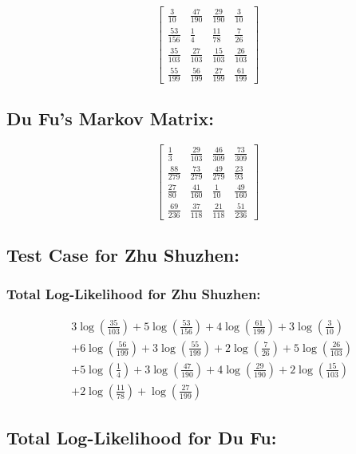 \documentclass[12pt]{article}
\begin{document}
\[
\begin{bmatrix}
\frac{3}{10} & \frac{47}{190} & \frac{29}{190} & \frac{3}{10} \\
\frac{53}{156} & \frac{1}{4} & \frac{11}{78} & \frac{7}{26} \\
\frac{35}{103} & \frac{27}{103} & \frac{15}{103} & \frac{26}{103} \\
\frac{55}{199} & \frac{56}{199} & \frac{27}{199} & \frac{61}{199}
\end{bmatrix}
\]

\subsection*{Du Fu's Markov Matrix:}

\[
\begin{bmatrix}
\frac{1}{3} & \frac{29}{103} & \frac{46}{309} & \frac{73}{309} \\
\frac{88}{279} & \frac{73}{279} & \frac{49}{279} & \frac{23}{93} \\
\frac{27}{80} & \frac{41}{160} & \frac{1}{10} & \frac{49}{160} \\
\frac{69}{236} & \frac{37}{118} & \frac{21}{118} & \frac{51}{236}
\end{bmatrix}
\]

\subsection*{Test Case for Zhu Shuzhen: }

\subsubsection*{Total Log-Likelihood for Zhu Shuzhen:}

\begin{align*}
& 3 \log\left(\frac{35}{103}\right) + 5 \log\left(\frac{53}{156}\right) + 4 \log\left(\frac{61}{199}\right) + 3 \log\left(\frac{3}{10}\right) \\
& + 6 \log\left(\frac{56}{199}\right) + 3 \log\left(\frac{55}{199}\right) + 2 \log\left(\frac{7}{26}\right) + 5 \log\left(\frac{26}{103}\right) \\
& + 5 \log\left(\frac{1}{4}\right) + 3 \log\left(\frac{47}{190}\right) + 4 \log\left(\frac{29}{190}\right) + 2 \log\left(\frac{15}{103}\right) \\
& + 2 \log\left(\frac{11}{78}\right) + \log\left(\frac{27}{199}\right)
\end{align*}

\subsection*{Total Log-Likelihood for Du Fu:}
\end{document}

